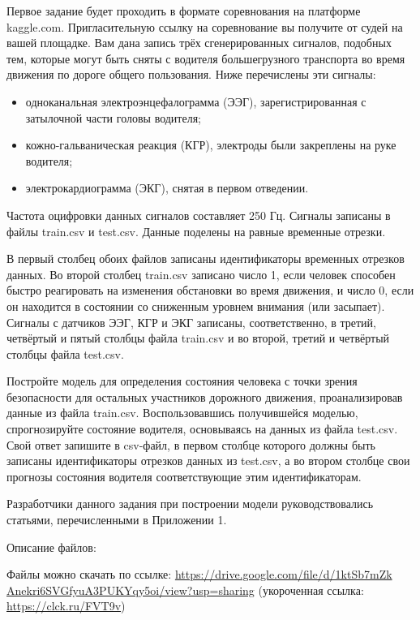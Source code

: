 
Первое задание будет проходить в формате соревнования на платформе kaggle.com. Пригласительную ссылку на соревнование вы получите от судей на вашей площадке.
Вам дана запись трёх сгенерированных сигналов, подобных тем, которые могут быть сняты с водителя большегрузного транспорта во время движения по дороге общего пользования. Ниже перечислены эти сигналы:

\begin{itemize}
    \item одноканальная электроэнцефалограмма (ЭЭГ), зарегистрированная с затылочной части головы водителя;
    \item кожно-гальваническая реакция (КГР), электроды были закреплены на руке водителя;
    \item электрокардиограмма (ЭКГ), снятая в первом отведении. 
\end{itemize}

Частота оцифровки данных сигналов составляет 250 Гц. Сигналы записаны в файлы train.csv и test.csv. Данные поделены на равные временные отрезки. 

В первый столбец обоих файлов записаны идентификаторы временных отрезков данных. Во второй столбец train.csv записано число 1, если человек способен быстро реагировать на изменения обстановки во время движения, и число 0, если он находится в состоянии со сниженным уровнем внимания (или засыпает). Сигналы с датчиков ЭЭГ, КГР и ЭКГ записаны, соответственно, в третий, четвёртый и пятый столбцы файла train.csv и во второй, третий и четвёртый столбцы файла test.csv.

Постройте модель для определения состояния человека с точки зрения безопасности для остальных участников дорожного движения, проанализировав данные из файла train.csv. Воспользовавшись получившейся моделью, спрогнозируйте состояние водителя, основываясь на данных из файла test.csv. Свой ответ запишите в csv-файл, в первом столбце которого должны быть записаны идентификаторы отрезков данных из test.csv, а во втором столбце свои прогнозы состояния водителя соответствующие этим идентификаторам.

Разработчики данного задания при построении модели руководствовались статьями, перечисленными в Приложении 1.

Описание файлов: 

Файлы можно скачать по ссылке: \url{https://drive.google.com/file/d/1ktSb7mZk} \linebreak \url{Anekri6SVGfyuA3PUKYqy5oi/view?usp=sharing}  (укороченная ссылка: \url{https://clck.ru/FVT9v})

